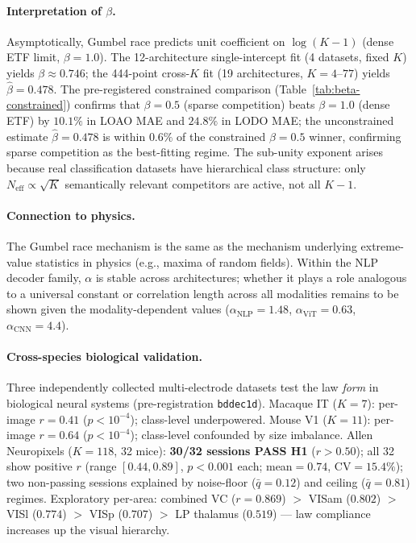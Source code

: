 \documentclass{article}
\begin{document}
\paragraph{Interpretation of $\beta$.}
Asymptotically, Gumbel race predicts unit coefficient on $\log(K-1)$ (dense ETF limit, $\beta=1.0$).
The 12-architecture single-intercept fit (4 datasets, fixed $K$) yields $\beta\approx0.746$;
the 444-point cross-$K$ fit (19 architectures, $K=4$--$77$) yields $\hat\beta=0.478$.
The pre-registered constrained comparison (Table~\ref{tab:beta-constrained}) confirms that
$\beta=0.5$ (sparse competition) beats $\beta=1.0$ (dense ETF) by $10.1\%$ in LOAO MAE and $24.8\%$
in LODO MAE; the unconstrained estimate $\hat\beta=0.478$ is within $0.6\%$ of the constrained
$\beta=0.5$ winner, confirming sparse competition as the best-fitting regime.
The sub-unity exponent arises because real classification datasets have hierarchical class
structure: only $N_\mathrm{eff}\propto\sqrt{K}$ semantically relevant competitors are active,
not all $K-1$.

\paragraph{Connection to physics.}
The Gumbel race mechanism is the same as the mechanism underlying extreme-value statistics in physics (e.g., maxima of random fields). Within the NLP decoder family, $\alpha$ is stable across architectures; whether it plays a role analogous to a universal constant or correlation length across all modalities remains to be shown given the modality-dependent values ($\alpha_\mathrm{NLP}=1.48$, $\alpha_\mathrm{ViT}=0.63$, $\alpha_\mathrm{CNN}=4.4$).

\paragraph{Cross-species biological validation.}
Three independently collected multi-electrode datasets test the law \emph{form} in biological neural systems (pre-registration \texttt{bddec1d}).
Macaque IT \citep{cadieu2014deep} ($K=7$): per-image $r=0.41$ ($p<10^{-4}$); class-level underpowered.
Mouse V1 \citep{stringer2018spontaneous} ($K=11$): per-image $r=0.64$ ($p<10^{-4}$); class-level confounded by size imbalance.
Allen Neuropixels \citep{siegle2021survey} ($K=118$, 32 mice): \textbf{30/32 sessions PASS H1} ($r>0.50$); all 32 show positive $r$ (range $[0.44, 0.89]$, $p<0.001$ each; mean$=0.74$, CV$=15.4\%$); two non-passing sessions explained by noise-floor ($\bar{q}=0.12$) and ceiling ($\bar{q}=0.81$) regimes.
Exploratory per-area: combined VC ($r=0.869$) $>$ VISam ($0.802$) $>$ VISl ($0.774$) $>$ VISp ($0.707$) $>$ LP thalamus ($0.519$) --- law compliance increases up the visual hierarchy.
\end{document}
